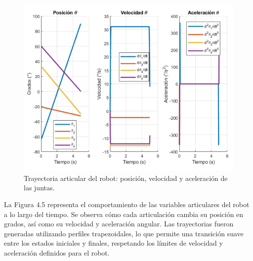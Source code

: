 \begin{figure} [H]
	\centering
	\includegraphics[width=0.9\linewidth]{img/inversa3}
	\caption{Trayectoria articular del robot: posición, velocidad y aceleración de las juntas.}
	\label{fig:inversa3}
\end{figure}
La Figura 4.5 representa el comportamiento de las variables articulares del robot a lo largo del tiempo. Se observa cómo cada articulación cambia su posición en grados, así como su velocidad y aceleración angular. Las trayectorias fueron generadas utilizando perfiles trapezoidales, lo que permite una transición suave entre los estados iniciales y finales, respetando los límites de velocidad y aceleración definidos para el robot.



















